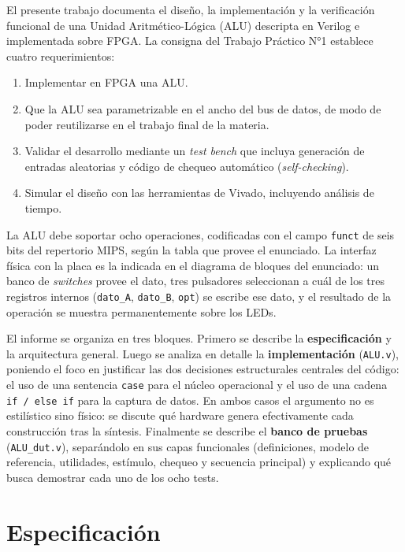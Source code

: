 \documentclass[12pt,a4paper]{article}
\begin{document}
El presente trabajo documenta el diseño, la implementación y la verificación
funcional de una Unidad Aritmético-Lógica (ALU) descripta en Verilog e
implementada sobre FPGA. La consigna del Trabajo Práctico N°1 establece cuatro
requerimientos:

\begin{enumerate}[leftmargin=2em,itemsep=0.2em]
  \item Implementar en FPGA una ALU.
  \item Que la ALU sea parametrizable en el ancho del bus de datos, de modo de
        poder reutilizarse en el trabajo final de la materia.
  \item Validar el desarrollo mediante un \emph{test bench} que incluya
        generación de entradas aleatorias y código de chequeo automático
        (\emph{self-checking}).
  \item Simular el diseño con las herramientas de Vivado, incluyendo análisis
        de tiempo.
\end{enumerate}

La ALU debe soportar ocho operaciones, codificadas con el campo \texttt{funct}
de seis bits del repertorio MIPS, según la tabla que provee el enunciado. La
interfaz física con la placa es la indicada en el diagrama de bloques del
enunciado: un banco de \emph{switches} provee el dato, tres pulsadores
seleccionan a cuál de los tres registros internos (\texttt{dato\_A},
\texttt{dato\_B}, \texttt{opt}) se escribe ese dato, y el resultado de la
operación se muestra permanentemente sobre los LEDs.

El informe se organiza en tres bloques. Primero se describe la
\textbf{especificación} y la arquitectura general. Luego se analiza en detalle
la \textbf{implementación} (\texttt{ALU.v}), poniendo el foco en justificar las
dos decisiones estructurales centrales del código: el uso de una sentencia
\texttt{case} para el núcleo operacional y el uso de una cadena
\texttt{if\,/\,else if} para la captura de datos. En ambos casos el argumento no
es estilístico sino físico: se discute qué hardware genera efectivamente cada
construcción tras la síntesis. Finalmente se describe el \textbf{banco de
pruebas} (\texttt{ALU\_dut.v}), separándolo en sus capas funcionales
(definiciones, modelo de referencia, utilidades, estímulo, chequeo y secuencia
principal) y explicando qué busca demostrar cada uno de los ocho tests.

\section{Especificación}
\end{document}
